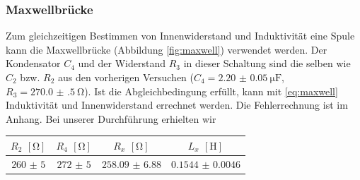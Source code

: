 \subsubsection{Maxwellbrücke}
Zum gleichzeitigen Bestimmen von Innenwiderstand und Induktivität eine Spule kann die Maxwellbrücke (Abbildung \ref{fig:maxwell}) verwendet werden. Der Kondensator $ C_4 $ und der Widerstand $ R_3 $ in dieser Schaltung sind die selben wie $ C_2 $ bzw. $ R_2 $ aus den vorherigen Versuchen ($ C_4 =  \SI{2.20(5)}{\micro\farad} $, $ R_3 = \SI{270.0(5)}{\ohm} $). Ist die Abgleichbedingung erfüllt, kann mit \eqref{eq:maxwell} Induktivität und Innenwiderstand errechnet werden. Die Fehlerrechnung ist im Anhang. Bei unserer Durchführung erhielten wir
\begin{table}[H]
	\centering
	\begin{tabular}{cccc}
		$ R_2 $ $ [\si{\ohm}] $ & $ R_4 $ $ [\si{\ohm}] $ & $ R_x $ $ [\si{\ohm}] $ & $ L_x $ $ [\si{\henry}] $ \\ \hline
		$ \num{260(5)} $ & $ \num{272(5)} $ & $ \num{258.09(688)} $ & $ \num{0.1544(00046)} $
	\end{tabular}
\end{table}

